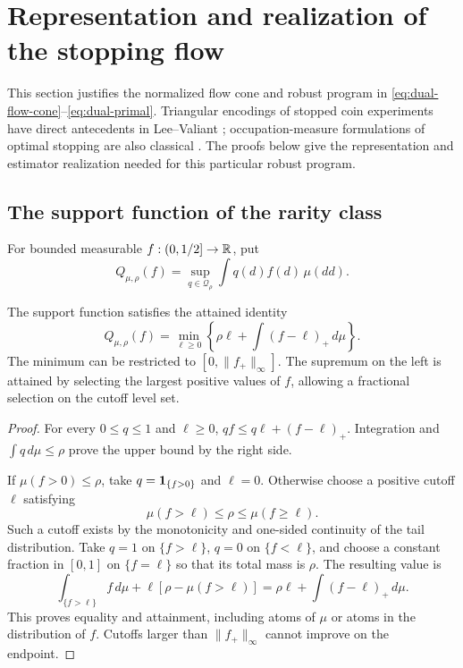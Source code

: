 \section{Representation and realization of the stopping flow}
\label{sec:flow-foundations}

This section justifies the normalized flow cone and robust program in
\eqref{eq:dual-flow-cone}--\eqref{eq:dual-primal}. Triangular encodings
of stopped coin experiments have direct antecedents in Lee--Valiant
\cite{lv}; occupation-measure formulations of optimal stopping are
also classical \cite{cs}. The proofs below give the representation
and estimator realization needed for this particular robust program.

\subsection{The support function of the rarity class}

For bounded measurable $f:(0,1/2]\to\mathbb R$, put
\[
 Q_{\mu,\rho}(f)
 =\sup_{q\in\mathcal Q_\rho}\int q(d)f(d)\,\mu(dd).
\]

\begin{lemma}\label{lem:ff-support}
The support function satisfies the attained identity
\begin{equation}\label{eq:ff-support}
 Q_{\mu,\rho}(f)
 =\min_{\ell\ge0}
       \left\{\rho\ell+\int(f-\ell)_+\,d\mu\right\}.
\end{equation}
The minimum can be restricted to
$[0,\|f_+\|_\infty]$. The supremum on the left is attained by selecting
the largest positive values of $f$, allowing a fractional selection
on the cutoff level set.
\end{lemma}

\begin{proof}
For every $0\le q\le1$ and $\ell\ge0$,
$qf\le q\ell+(f-\ell)_+$. Integration and $\int q\,d\mu\le\rho$
prove the upper bound by the right side.

If $\mu(f>0)\le\rho$, take $q=\mathbf 1_{\{f>0\}}$ and $\ell=0$.
Otherwise choose a positive cutoff $\ell$ satisfying
\[
 \mu(f>\ell)\le\rho\le\mu(f\ge\ell).
\]
Such a cutoff exists by the monotonicity and one-sided continuity of
the tail distribution. Take $q=1$ on $\{f>\ell\}$, $q=0$ on
$\{f<\ell\}$, and choose a constant fraction in $[0,1]$ on
$\{f=\ell\}$ so that its total mass is $\rho$.
The resulting value is
\[
 \int_{\{f>\ell\}}f\,d\mu
   +\ell[\rho-\mu(f>\ell)]
 =\rho\ell+\int(f-\ell)_+\,d\mu.
\]
This proves equality and attainment, including atoms of $\mu$ or
atoms in the distribution of $f$. Cutoffs larger than
$\|f_+\|_\infty$ cannot improve on the endpoint.
\end{proof}

